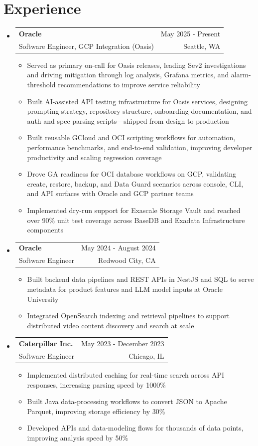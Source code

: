 \documentclass[letterpaper,11pt]{article}
\makeatletter
\newcommand{\resumeItem}[1]{
  \item\small{
    {#1 \vspace{-1pt}}
  }
}
\newcommand{\resumeSubheading}[4]{
  \vspace{-2pt}\item
    \begin{tabular*}{0.97\textwidth}[t]{l@{\extracolsep{\fill}}r}
      \textbf{#1} & #2 \\
      {\small#3} & {\small #4} \\
    \end{tabular*}\vspace{-7pt}
}
\newcommand{\resumeSubHeadingListStart}{\begin{itemize}[leftmargin=0.15in, label={}]}
\newcommand{\resumeSubHeadingListEnd}{\end{itemize}}
\newcommand{\resumeItemListStart}{\begin{itemize}[leftmargin=0.18in,itemsep=1pt,topsep=2pt]}
\newcommand{\resumeItemListEnd}{\end{itemize}\vspace{-5pt}}
\makeatother
\begin{document}
\section{Experience}
  \resumeSubHeadingListStart

    \resumeSubheading
  {Oracle}{May 2025 - Present}
  {Software Engineer, GCP Integration (Oasis)}{Seattle, WA}
  \resumeItemListStart
    \resumeItem{Served as primary on-call for Oasis releases, leading Sev2 investigations and driving mitigation through log analysis, Grafana metrics, and alarm-threshold recommendations to improve service reliability}
    \resumeItem{Built AI-assisted API testing infrastructure for Oasis services, designing prompting strategy, repository structure, onboarding documentation, and auth and spec parsing scripts---shipped from design to production}
    \resumeItem{Built reusable GCloud and OCI scripting workflows for automation, performance benchmarks, and end-to-end validation, improving developer productivity and scaling regression coverage}
    \resumeItem{Drove GA readiness for OCI database workflows on GCP, validating create, restore, backup, and Data Guard scenarios across console, CLI, and API surfaces with Oracle and GCP partner teams}
    \resumeItem{Implemented dry-run support for Exascale Storage Vault and reached over 90\% unit test coverage across BaseDB and Exadata Infrastructure components}
  \resumeItemListEnd

    \resumeSubheading
      {Oracle}{May 2024 - August 2024}
      {Software Engineer}{Redwood City, CA}
      \resumeItemListStart
        \resumeItem{Built backend data pipelines and REST APIs in NestJS and SQL to serve metadata for product features and LLM model inputs at Oracle University}
        \resumeItem{Integrated OpenSearch indexing and retrieval pipelines to support distributed video content discovery and search at scale}
      \resumeItemListEnd

    \resumeSubheading
      {Caterpillar Inc.}{May 2023 - December 2023}
      {Software Engineer}{Chicago, IL}
      \resumeItemListStart
        \resumeItem{Implemented distributed caching for real-time search across API responses, increasing parsing speed by 1000\%}
        \resumeItem{Built Java data-processing workflows to convert JSON to Apache Parquet, improving storage efficiency by 30\%}
        \resumeItem{Developed APIs and data-modeling flows for thousands of data points, improving analysis speed by 50\%}
      \resumeItemListEnd

  \resumeSubHeadingListEnd
\end{document}
